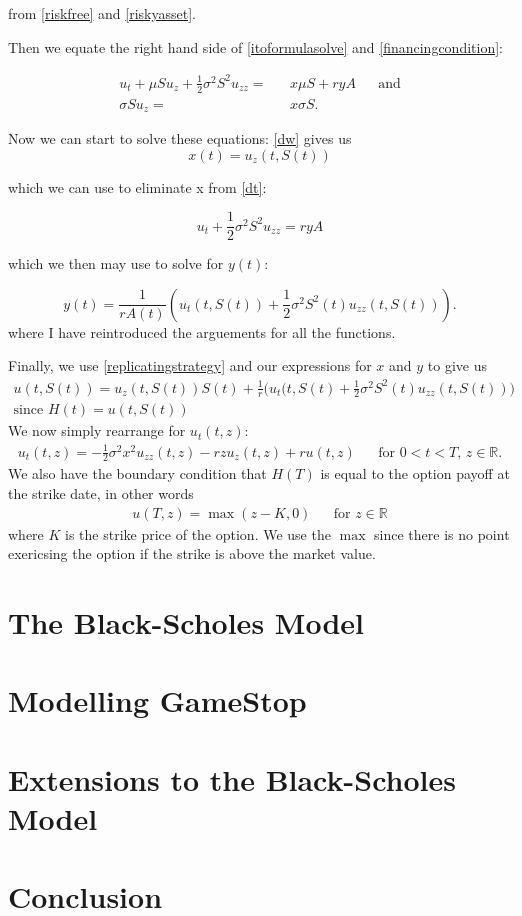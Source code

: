 \documentclass[11pt]{article} %
\begin{document}
from \ref{riskfree} and \ref{riskyasset}.

Then we equate the right hand side of \ref{itoformulasolve} and \ref{financingcondition}:

\begin{align}\label{dt}
    u_t + \mu S u_z + \frac{1}{2} \sigma^2 S^2 u_{zz}  = &&x\mu S + ryA &&\text{and} \\
    \sigma Su_z =&& x\sigma S.\label{dw}
\end{align}

Now we can start to solve these equations: \ref{dw} gives us
\begin{equation}
    x(t) = u_z(t,S(t))
\end{equation}

which we can use to eliminate x from \ref{dt}:

\begin{equation}
    u_t + \frac{1}{2}\sigma ^2 S^2u_{zz} = ryA
\end{equation}

which we then may use to solve for $y(t)$:

\begin{equation}
    y(t) = \frac{1}{rA(t)}(u_t(t,S(t)) + \frac{1}{2} \sigma^2S^2(t)u_{zz}(t,S(t)) ).
\end{equation}
where I have reintroduced the arguements for all the functions.

Finally, we use \ref{replicatingstrategy} and our expressions for $x$ and $y$ to give us
\begin{align}
    u(t,S(t)) = u_z(t,S(t))S(t) + \frac{1}{r}\bigg(u_t(t,S(t) + \frac{1}{2}\sigma^2S^2(t)
    u_{zz}(t,S(t))\bigg) \\\text{since $H(t) = u(t,S(t))$}
\end{align}
We now simply rearrange for $u_t(t,z)$:
\begin{align}\label{blackscholes}
    u_t(t,z) = -\frac{1}{2}\sigma^2x^2u_{zz}(t,z) - rzu_z(t,z) + ru(t,z) 
   && \text{for $0<t<T$, $z \in \mathbb{R}$.}
\end{align}
We also have the boundary condition that $H(T)$ is equal to the option payoff at the strike 
date, in other words 
\begin{align}
    u(T,z) = \max{(z - K , 0)} && \text{for $z \in \mathbb{R}$}
\end{align}
where $K$ is the strike price of the option. We use the $\max$ since there is no point exericsing 
the option if the strike is above the market value. 

\section{The Black-Scholes Model}

\section{Modelling GameStop}

\section{Extensions to the Black-Scholes Model}

\section{Conclusion}

\printbibliography %
\end{document}
